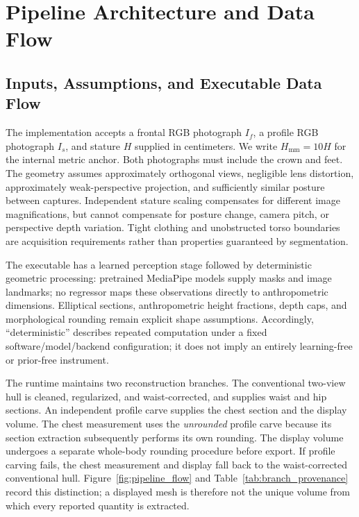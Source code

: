 \documentclass[11pt,a4paper]{article}
\numberwithin{equation}{section}
\begin{document}
\section{Pipeline Architecture and Data Flow}
\label{sec:system_pipeline}

\subsection{Inputs, Assumptions, and Executable Data Flow}
The implementation accepts a frontal RGB photograph $I_f$, a profile RGB photograph $I_s$, and stature $H$ supplied in centimeters. We write $H_{\mathrm{mm}}=10H$ for the internal metric anchor. Both photographs must include the crown and feet. The geometry assumes approximately orthogonal views, negligible lens distortion, approximately weak-perspective projection, and sufficiently similar posture between captures. Independent stature scaling compensates for different image magnifications, but cannot compensate for posture change, camera pitch, or perspective depth variation. Tight clothing and unobstructed torso boundaries are acquisition requirements rather than properties guaranteed by segmentation.

The executable has a learned perception stage followed by deterministic geometric processing: pretrained MediaPipe models supply masks and image landmarks; no regressor maps these observations directly to anthropometric dimensions. Elliptical sections, anthropometric height fractions, depth caps, and morphological rounding remain explicit shape assumptions. Accordingly, ``deterministic'' describes repeated computation under a fixed software/model/backend configuration; it does not imply an entirely learning-free or prior-free instrument.

The runtime maintains two reconstruction branches. The conventional two-view hull is cleaned, regularized, and waist-corrected, and supplies waist and hip sections. An independent profile carve supplies the chest section and the display volume. The chest measurement uses the \emph{unrounded} profile carve because its section extraction subsequently performs its own rounding. The display volume undergoes a separate whole-body rounding procedure before export. If profile carving fails, the chest measurement and display fall back to the waist-corrected conventional hull. Figure~\ref{fig:pipeline_flow} and Table~\ref{tab:branch_provenance} record this distinction; a displayed mesh is therefore not the unique volume from which every reported quantity is extracted.
\end{document}
